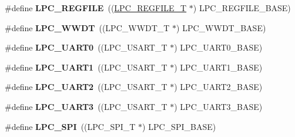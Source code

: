 \begin{DoxyCompactItemize}
\item 
\hypertarget{group___p_e_r_i_p_h__175_x__6_x___b_a_s_e_ga2c74da31b7fd461d9b01e3241963f895}{\#define {\bfseries L\+P\+C\+\_\+\+R\+E\+G\+F\+I\+L\+E}~((\hyperlink{struct_l_p_c___r_e_g_f_i_l_e___t}{L\+P\+C\+\_\+\+R\+E\+G\+F\+I\+L\+E\+\_\+\+T}          $\ast$) L\+P\+C\+\_\+\+R\+E\+G\+F\+I\+L\+E\+\_\+\+B\+A\+S\+E)}\label{group___p_e_r_i_p_h__175_x__6_x___b_a_s_e_ga2c74da31b7fd461d9b01e3241963f895}

\item 
\hypertarget{group___p_e_r_i_p_h__175_x__6_x___b_a_s_e_ga235e068b1412366044449dba68194c55}{\#define {\bfseries L\+P\+C\+\_\+\+W\+W\+D\+T}~((L\+P\+C\+\_\+\+W\+W\+D\+T\+\_\+\+T             $\ast$) L\+P\+C\+\_\+\+W\+W\+D\+T\+\_\+\+B\+A\+S\+E)}\label{group___p_e_r_i_p_h__175_x__6_x___b_a_s_e_ga235e068b1412366044449dba68194c55}

\item 
\hypertarget{group___p_e_r_i_p_h__175_x__6_x___b_a_s_e_ga6ba29f0f9b8af2f72e303533185bcc82}{\#define {\bfseries L\+P\+C\+\_\+\+U\+A\+R\+T0}~((L\+P\+C\+\_\+\+U\+S\+A\+R\+T\+\_\+\+T            $\ast$) L\+P\+C\+\_\+\+U\+A\+R\+T0\+\_\+\+B\+A\+S\+E)}\label{group___p_e_r_i_p_h__175_x__6_x___b_a_s_e_ga6ba29f0f9b8af2f72e303533185bcc82}

\item 
\hypertarget{group___p_e_r_i_p_h__175_x__6_x___b_a_s_e_ga83ea0dab4dcb7411c2e1de20050a4d2d}{\#define {\bfseries L\+P\+C\+\_\+\+U\+A\+R\+T1}~((L\+P\+C\+\_\+\+U\+S\+A\+R\+T\+\_\+\+T            $\ast$) L\+P\+C\+\_\+\+U\+A\+R\+T1\+\_\+\+B\+A\+S\+E)}\label{group___p_e_r_i_p_h__175_x__6_x___b_a_s_e_ga83ea0dab4dcb7411c2e1de20050a4d2d}

\item 
\hypertarget{group___p_e_r_i_p_h__175_x__6_x___b_a_s_e_gac8badf231948fc9216d416c71a34e924}{\#define {\bfseries L\+P\+C\+\_\+\+U\+A\+R\+T2}~((L\+P\+C\+\_\+\+U\+S\+A\+R\+T\+\_\+\+T            $\ast$) L\+P\+C\+\_\+\+U\+A\+R\+T2\+\_\+\+B\+A\+S\+E)}\label{group___p_e_r_i_p_h__175_x__6_x___b_a_s_e_gac8badf231948fc9216d416c71a34e924}

\item 
\hypertarget{group___p_e_r_i_p_h__175_x__6_x___b_a_s_e_ga61c2bf57d66b50108cdec6878f9e8ee5}{\#define {\bfseries L\+P\+C\+\_\+\+U\+A\+R\+T3}~((L\+P\+C\+\_\+\+U\+S\+A\+R\+T\+\_\+\+T            $\ast$) L\+P\+C\+\_\+\+U\+A\+R\+T3\+\_\+\+B\+A\+S\+E)}\label{group___p_e_r_i_p_h__175_x__6_x___b_a_s_e_ga61c2bf57d66b50108cdec6878f9e8ee5}

\item 
\hypertarget{group___p_e_r_i_p_h__175_x__6_x___b_a_s_e_ga9b593f008d0061052e90a8865d702ce5}{\#define {\bfseries L\+P\+C\+\_\+\+S\+P\+I}~((L\+P\+C\+\_\+\+S\+P\+I\+\_\+\+T              $\ast$) L\+P\+C\+\_\+\+S\+P\+I\+\_\+\+B\+A\+S\+E)}\label{group___p_e_r_i_p_h__175_x__6_x___b_a_s_e_ga9b593f008d0061052e90a8865d702ce5}


\end{DoxyCompactItemize}
